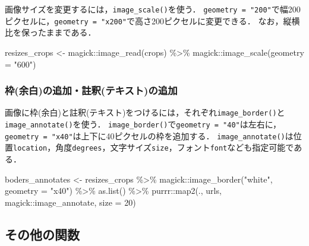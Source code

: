 \documentclass[
]{article}
\newenvironment{Shaded}{\begin{snugshade}}{\end{snugshade}}
\newcommand{\AttributeTok}[1]{\textcolor[rgb]{0.77,0.63,0.00}{#1}}
\newcommand{\DecValTok}[1]{\textcolor[rgb]{0.00,0.00,0.81}{#1}}
\newcommand{\FunctionTok}[1]{\textcolor[rgb]{0.00,0.00,0.00}{#1}}
\newcommand{\NormalTok}[1]{#1}
\newcommand{\OtherTok}[1]{\textcolor[rgb]{0.56,0.35,0.01}{#1}}
\newcommand{\SpecialCharTok}[1]{\textcolor[rgb]{0.00,0.00,0.00}{#1}}
\newcommand{\StringTok}[1]{\textcolor[rgb]{0.31,0.60,0.02}{#1}}
\begin{document}
画像サイズを変更するには，\texttt{image\_scale()}を使う．
\texttt{geometry\ =\ "200"}で幅200ピクセルに，\texttt{geometry\ =\ "x200"}で高さ200ピクセルに変更できる．
なお，縦横比を保ったままである．

\begin{Shaded}
\begin{Highlighting}[]
\NormalTok{resizes\_crops }\OtherTok{\textless{}{-}} 
\NormalTok{  magick}\SpecialCharTok{::}\FunctionTok{image\_read}\NormalTok{(crops) }\SpecialCharTok{\%\textgreater{}\%}
\NormalTok{  magick}\SpecialCharTok{::}\FunctionTok{image\_scale}\NormalTok{(}\AttributeTok{geometry =} \StringTok{"600"}\NormalTok{)}
\end{Highlighting}
\end{Shaded}

\hypertarget{ux67a0ux4f59ux767dux306eux8ffdux52a0ux8a3bux91c8ux30c6ux30adux30b9ux30c8ux306eux8ffdux52a0}{%
\subsubsection{枠(余白)の追加・註釈(テキスト)の追加}\label{ux67a0ux4f59ux767dux306eux8ffdux52a0ux8a3bux91c8ux30c6ux30adux30b9ux30c8ux306eux8ffdux52a0}}

画像に枠(余白)と註釈(テキスト)をつけるには，それぞれ\texttt{image\_border()}と\texttt{image\_annotate()}を使う．
\texttt{image\_border()}で\texttt{geometry\ =\ "40"}は左右に，\texttt{geometry\ =\ "x40"}は上下に40ピクセルの枠を追加する．
\texttt{image\_annotate()}は位置\texttt{location}，角度\texttt{degrees}，文字サイズ\texttt{size}，フォント\texttt{font}なども指定可能である．

\begin{Shaded}
\begin{Highlighting}[]
\NormalTok{boders\_annotates }\OtherTok{\textless{}{-}} 
\NormalTok{  resizes\_crops }\SpecialCharTok{\%\textgreater{}\%}
\NormalTok{  magick}\SpecialCharTok{::}\FunctionTok{image\_border}\NormalTok{(}\StringTok{"white"}\NormalTok{, }\AttributeTok{geometry =} \StringTok{"x40"}\NormalTok{) }\SpecialCharTok{\%\textgreater{}\%}
  \FunctionTok{as.list}\NormalTok{() }\SpecialCharTok{\%\textgreater{}\%}
\NormalTok{  purrr}\SpecialCharTok{::}\FunctionTok{map2}\NormalTok{(., urls, magick}\SpecialCharTok{::}\NormalTok{image\_annotate, }\AttributeTok{size =} \DecValTok{20}\NormalTok{)}
\end{Highlighting}
\end{Shaded}

\hypertarget{ux305dux306eux4ed6ux306eux95a2ux6570}{%
\subsection{その他の関数}\label{ux305dux306eux4ed6ux306eux95a2ux6570}}
\end{document}
